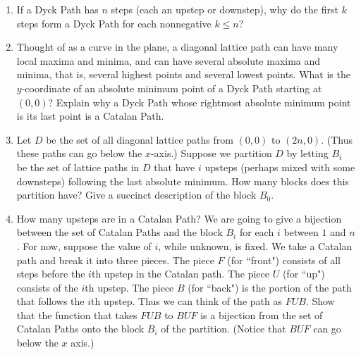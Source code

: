 \begin{enumerate} 
\item If a Dyck Path has $n$ steps (each an upstep or
downstep), why do the first $k$ steps form a Dyck Path for each nonnegative
$k\le n$?
\item Thought of as a curve in the plane, a diagonal lattice path can have many
local maxima and minima, and can have several absolute maxima and minima, that is,
several highest points and several lowest points. What is the $y$-coordinate
of an absolute minimum point of a Dyck Path starting at $(0,0)$?  Explain why
a Dyck Path whose rightmost absolute minimum point is its last point is a
Catalan Path.
\item Let $D$ be the set of all diagonal lattice paths from $(0,0)$ to
$(2n,0)$.  (Thus these paths can go below the $x$-axis.) Suppose we partition
$D$ by letting
$B_i$ be the set of lattice paths in $D$ that have $i$ upsteps (perhaps mixed
with some downsteps) following the last absolute minimum.  How many blocks
does this partition have?  Give a succinct description of the block $B_0$.
\item How many upsteps are in a Catalan Path?  
\itemitemh We are going to give a bijection between the set of Catalan Paths and
the block $B_i$ for each $i$ between $1$ and $n$.  For now, suppose the
value of $i$, while unknown, is fixed.  We take a Catalan path and break it
into three pieces.  The piece $F$ (for ``front") consists of all steps before
the
$i$th upstep in the Catalan path.  The piece $U$ (for ``up") consists of the
$i$th upstep.  The piece
$B$ (for ``back") is the portion of the path that follows the $i$th upstep. 
Thus we can think of the path as $FUB$.  Show that the function that takes
$FUB$ to
$BUF$ is a bijection from the set of Catalan Paths onto the block $B_i$ of the
partition.  (Notice that $BUF$ can go below the $x$ axis.)
\end{enumerate}
